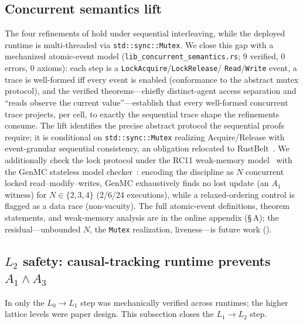 \documentclass[journal,compsoc,10pt]{IEEEtran}
\providecommand{\citep}{\cite}
\theoremstyle{definition}
\theoremstyle{remark}
\begin{document}
\subsection{Concurrent semantics lift}
\label{sec:concurrent-semantics}
The four refinements of  hold under sequential
interleaving, while the deployed runtime is multi-threaded via
\texttt{std::sync::Mutex}. We close this gap with a mechanized atomic-event
model (\texttt{lib\_concurrent\_semantics.rs}; 9 verified, 0 errors, 0
axioms): each step is a \texttt{LockAcquire}/\texttt{LockRelease}/%
\texttt{Read}/\texttt{Write} event, a trace is well-formed iff every event
is enabled (conformance to the abstract mutex protocol), and the verified
theorems---chiefly distinct-agent access separation and ``reads observe the
current value''---establish that every well-formed concurrent trace
projects, per cell, to exactly the sequential trace shape the refinements
consume. The lift identifies the precise abstract protocol the sequential
proofs require; it is conditional on \texttt{std::sync::Mutex} realizing
Acquire/Release with event-granular sequential consistency, an obligation
relocated to RustBelt~\citep{Jung2017RustBelt}. We additionally check the
lock protocol under the RC11 weak-memory model~\citep{LahavEtAl2017RC11}
with the GenMC stateless model
checker~\citep{KokologiannakisVafeiadis2021GenMC}: encoding the discipline
as $N$ concurrent locked read--modify--writes, GenMC exhaustively finds no
lost update (an $A_1$ witness) for $N\in\{2,3,4\}$ (2/6/24 executions),
while a relaxed-ordering control is flagged as a data race (non-vacuity).
The full atomic-event definitions, theorem statements, and weak-memory
analysis are in the online appendix (\S\,A); the residual---unbounded $N$,
the \texttt{Mutex} realization, liveness---is future work
().

\subsection{$L_2$ safety: causal-tracking runtime prevents $A_1 \wedge A_3$}
\label{sec:l2-safety}

In  only the $L_0 \to L_1$ step was
mechanically verified across runtimes; the higher lattice levels were
paper design. This
subsection closes the $L_1 \to L_2$ step.
\end{document}
